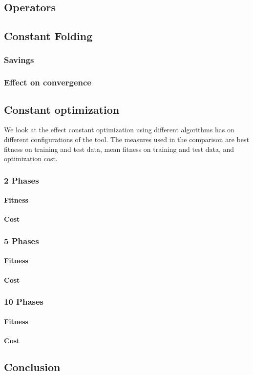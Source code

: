 \subsection{Operators}


\subsection{Constant Folding}
\subsubsection{Savings}
\subsubsection{Effect on convergence}

\subsection{Constant optimization}
We look at the effect constant optimization using different algorithms has on different configurations of the tool. The measures used in the comparison are best fitness on training and test data, mean fitness on training and test data, and optimization cost.

\subsubsection{2 Phases}
\paragraph{Fitness}
\paragraph{Cost}

\subsubsection{5 Phases}
\paragraph{Fitness}
\paragraph{Cost}

\subsubsection{10 Phases}
\paragraph{Fitness}
\paragraph{Cost}


\subsection{Conclusion}
